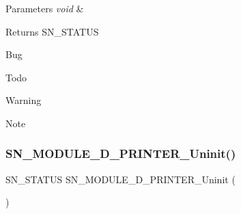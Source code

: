 \begin{DoxyParams}{Parameters}
{\em void} & \\
\hline
\end{DoxyParams}
\begin{DoxyReturn}{Returns}
S\+N\+\_\+\+S\+T\+A\+T\+US 
\end{DoxyReturn}
\begin{DoxyRefDesc}{Bug}
\item[\hyperlink{bug__bug000005}{Bug}]\end{DoxyRefDesc}
\begin{DoxyRefDesc}{Todo}
\item[\hyperlink{todo__todo000005}{Todo}]\end{DoxyRefDesc}
\begin{DoxyWarning}{Warning}

\end{DoxyWarning}
\begin{DoxyNote}{Note}

\end{DoxyNote}
\mbox{\label{group__D_ga776f5e31b0c0e176e35669f9432baec0}} 
\subsubsection{\texorpdfstring{S\+N\+\_\+\+M\+O\+D\+U\+L\+E\+\_\+D\+\_\+\+P\+R\+I\+N\+T\+E\+R\+\_\+\+Uninit()}{SN\_MODULE\_3D\_PRINTER\_Uninit()}}
{\footnotesize\ttfamily S\+N\+\_\+\+S\+T\+A\+T\+US S\+N\+\_\+\+M\+O\+D\+U\+L\+E\+\_\+D\+\_\+\+P\+R\+I\+N\+T\+E\+R\+\_\+\+Uninit (\begin{DoxyParamCaption}\item[{void}]{ }\end{DoxyParamCaption})}


